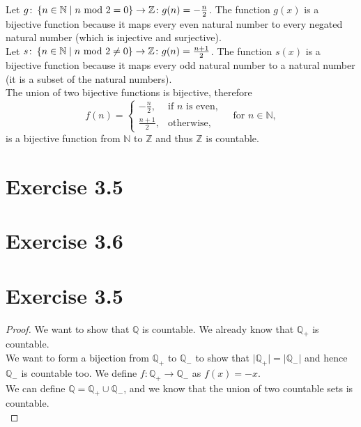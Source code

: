 \documentclass{article} %
\newcommand{\homeworkNumber}{3}
\begin{document}
Let \( g \colon \left\{ n \in \mathbb{N} \mid n \text{ mod } 2 = 0 \\ \right\} \to \mathbb{Z} \colon g(n) = -\frac{n}{2} \).
The function \( g(x) \) is a bijective function because it maps every
even natural number to every negated natural number (which is injective and surjective). \\
Let \( s \colon \left\{ n \in \mathbb{N} \mid n \text{ mod } 2 \neq  0 \\ \right\} \to \mathbb{Z} \colon g(n) = \frac{n+1}{2} \).
The function \( s(x) \) is a bijective function because it maps every odd natural number to a natural number
(it is a subset of the natural numbers). \\
The union of two bijective functions is bijective, therefore
\begin{equation*}
	f(n) =
	\begin{cases}
		-\frac{n}{2},  & \text{if } n \text{ is even}, \\
		\frac{n+1}{2}, & \text{otherwise},
	\end{cases}
	\quad \text{for } n \in \mathbb{N},
\end{equation*}
is a bijective function from \( \mathbb{N} \) to \( \mathbb{Z} \) and thus \( \mathbb{Z} \) is countable.


\section*{Exercise \homeworkNumber.5}


\section*{Exercise \homeworkNumber.6}


\section*{Exercise \homeworkNumber.5}
\begin{proof}
We want to show that $\mathbb Q$ is countable. We already know that $\mathbb Q_+$ is countable. \\
We want to form a bijection from $\mathbb Q_+$ to $\mathbb Q_-$ to show that $\lvert \mathbb Q_+ \lvert = \lvert \mathbb Q_- \lvert$ and hence $\mathbb Q_-$ is countable too.
We define $f:\mathbb Q_+ \rightarrow \mathbb Q_-$ as $f(x) = -x$. \\
We can define $\mathbb Q = \mathbb Q_+ \cup \mathbb Q_-$, and we know that the union of two countable sets is countable. \\
\end{proof}
\end{document}

